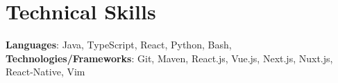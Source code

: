 \section{Technical Skills}
\begin{itemize}[leftmargin=0.15in, label={}]
	\small{\item{
	      \textbf{Languages}{: Java, TypeScript, React, Python, Bash, } \\
	      \textbf{Technologies/Frameworks}{: Git, Maven, React.js, Vue.js, Next.js, Nuxt.js, React-Native, Vim}}} \\
\end{itemize}
